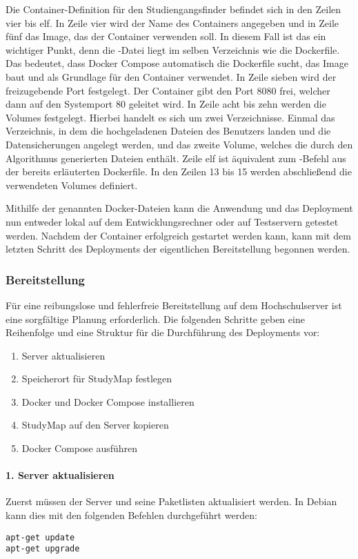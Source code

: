 Die Container-Definition für den Studiengangsfinder befindet sich in den Zeilen vier bis elf. In Zeile vier wird der Name des Containers angegeben und in Zeile fünf das Image, das der Container verwenden soll. In diesem Fall ist das ein wichtiger Punkt, denn die -Datei liegt im selben Verzeichnis wie die Dockerfile. Das bedeutet, dass Docker Compose automatisch die Dockerfile sucht, das Image baut und als Grundlage für den Container verwendet. In Zeile sieben wird der freizugebende Port festgelegt. Der Container gibt den Port 8080 frei, welcher dann auf den Systemport 80 geleitet wird. In Zeile acht bis zehn werden die Volumes festgelegt. Hierbei handelt es sich um zwei Verzeichnisse. Einmal das Verzeichnis, in dem die hochgeladenen Dateien des Benutzers landen und die Datensicherungen angelegt werden, und das zweite Volume, welches die durch den Algorithmus generierten Dateien enthält. Zeile elf ist äquivalent zum -Befehl aus der bereits erläuterten Dockerfile. In den Zeilen 13 bis 15 werden abschließend die verwendeten Volumes definiert.

Mithilfe der genannten Docker-Dateien kann die Anwendung und das Deployment nun entweder lokal auf dem Entwicklungsrechner oder auf Testservern getestet werden. Nachdem der Container erfolgreich gestartet werden kann, kann mit dem letzten Schritt des Deployments der eigentlichen Bereitstellung begonnen werden.

\subsubsection{Bereitstellung}
Für eine reibungslose und fehlerfreie Bereitstellung auf dem Hochschulserver ist eine sorgfältige Planung erforderlich. Die folgenden Schritte geben eine Reihenfolge und eine Struktur für die Durchführung des Deployments vor:
\begin{enumerate}
    \item Server aktualisieren
    \item Speicherort für StudyMap festlegen
    \item Docker und Docker Compose installieren
    \item StudyMap auf den Server kopieren
    \item Docker Compose ausführen
\end{enumerate}

\paragraph*{1. Server aktualisieren}
Zuerst müssen der Server und seine Paketlisten aktualisiert werden. In Debian kann dies mit den folgenden Befehlen durchgeführt werden:
\begin{lstlisting}[style=Python]
apt-get update
apt-get upgrade
\end{lstlisting}

